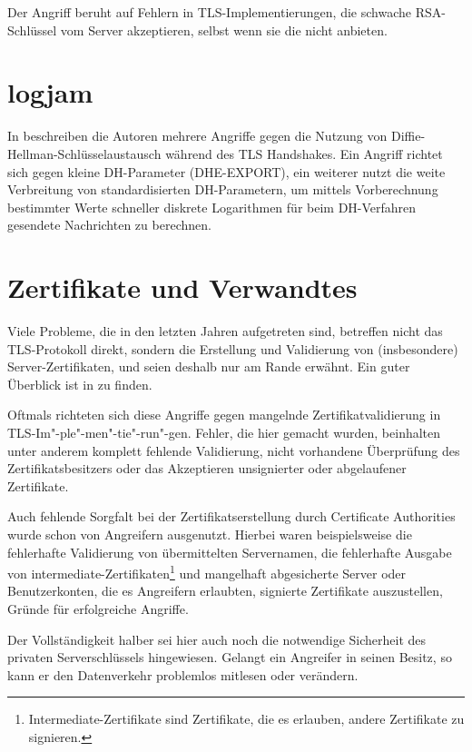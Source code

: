 Der Angriff beruht auf Fehlern in TLS-Implementierungen, die schwache RSA-Schlüssel vom Server akzeptieren, selbst wenn sie die \ciphersuites{} nicht anbieten.

\section{logjam}

In \cite{logjam15} beschreiben die Autoren mehrere Angriffe gegen die Nutzung von Diffie-Hellman-Schlüsselaustausch während des TLS Handshakes. Ein Angriff richtet sich gegen kleine DH-Parameter (DHE-EXPORT), ein weiterer nutzt die weite Verbreitung von standardisierten DH-Parametern, um mittels Vorberechnung bestimmter Werte schneller diskrete Logarithmen für beim DH-Verfahren gesendete Nachrichten zu berechnen.

\section{Zertifikate und Verwandtes}

\label{sec_certificates}

Viele Probleme, die in den letzten Jahren aufgetreten sind, betreffen nicht das TLS-Protokoll direkt, sondern die Erstellung und Validierung von (insbesondere) Server-Zertifikaten, und seien deshalb nur am Rande erwähnt. Ein guter Überblick ist in \cite{meyer13} zu finden.

Oftmals richteten sich diese Angriffe gegen mangelnde Zertifikatvalidierung in TLS-Im"-ple"-men"-tie"-run"-gen. Fehler, die hier gemacht wurden, beinhalten unter anderem komplett fehlende Validierung, nicht vorhandene Überprüfung des Zertifikatsbesitzers oder das Akzeptieren unsignierter oder abgelaufener Zertifikate.

Auch fehlende Sorgfalt bei der Zertifikatserstellung durch Certificate Authorities wurde schon von Angreifern ausgenutzt. Hierbei waren beispielsweise die fehlerhafte Validierung von übermittelten Servernamen, die fehlerhafte Ausgabe von intermediate-Zertifikaten\footnote{Intermediate-Zertifikate sind Zertifikate, die es erlauben, andere Zertifikate zu signieren.} und mangelhaft abgesicherte Server oder Benutzerkonten, die es Angreifern erlaubten, signierte Zertifikate auszustellen, Gründe für erfolgreiche Angriffe.

Der Vollständigkeit halber sei hier auch noch die notwendige Sicherheit des privaten Serverschlüssels hingewiesen. Gelangt ein Angreifer in seinen Besitz, so kann er den Datenverkehr problemlos mitlesen oder verändern.